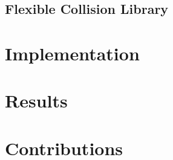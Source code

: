 \documentclass{article}
\begin{document}
\subsection{Flexible Collision Library}

\section{Implementation}

\section{Results}

\section{Contributions}























\end{document}
